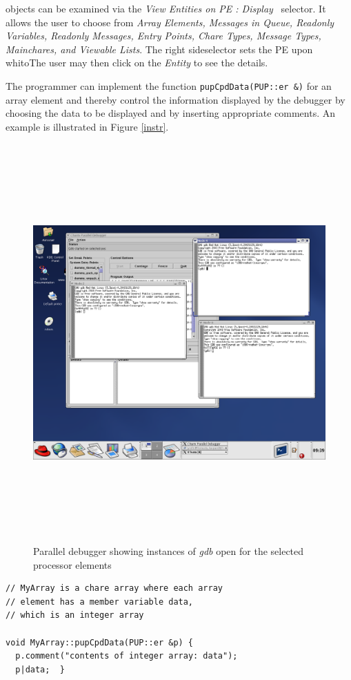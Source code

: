 \documentclass[10pt,dvips]{article}
\begin{document}
\charmpp{} objects can be examined via  the \textit{View Entities on PE : Display} \ selector.  It allows the user to choose from  \textit{Array Elements, Messages in Queue, Readonly Variables, Readonly Messages, Entry Points, Chare Types, Message Types, Mainchares, and Viewable Lists}.  The right sideselector sets the PE upon whitoThe user may then click on the \textit{Entity} to see the details. 

The programmer can implement the function \texttt{pupCpdData(PUP::er
\&)} for an array element and thereby control the information
displayed by the debugger by choosing the data to be displayed and by
inserting appropriate comments. An example is illustrated in Figure
\ref{instr}.

\begin{figure}[]
\includegraphics[scale=0.75,height=6in, width=6in]{figs/snapshot4}
\caption{Parallel debugger showing instances of \textit{gdb}
open for the selected processor elements}
\label{snapshot4}
\end{figure}

\begin{verbatim}
// MyArray is a chare array where each array
// element has a member variable data, 
// which is an integer array

void MyArray::pupCpdData(PUP::er &p) {
  p.comment("contents of integer array: data");
  p|data;  }
\end{verbatim}
\end{document}
